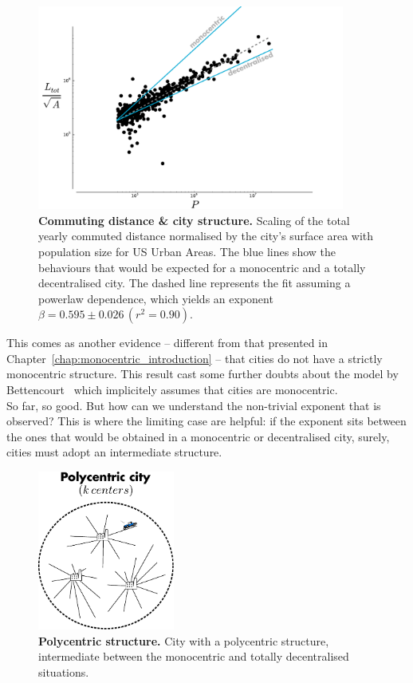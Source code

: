 \begin{figure}
    \centering
    \includegraphics[width=0.9\textwidth]{gfx/chapter-scaling/scaling_commuting_norm.pdf}
    \caption{{\bf Commuting distance \& city structure.} Scaling of the total yearly commuted distance normalised by the
    city's surface area with population size for US Urban Areas. The blue lines
show the behaviours that would be expected for a monocentric and a totally
decentralised city. The dashed line represents the fit assuming a powerlaw
dependence, which yields an exponent $\beta =  0.595 \pm 0.026\, (r^2 =
0.90)$.\label{fig:scaling_Ltot_norm}}
    
\end{figure}

This comes as another evidence -- different from that presented in
Chapter~\ref{chap:monocentric_introduction} -- that cities do not have a
strictly monocentric structure. This result cast some further doubts about the
model by Bettencourt~\cite{Bettencourt:2013} which implicitely assumes that
cities are monocentric.\\

So far, so good. But how can we understand the non-trivial exponent that is observed? This is
where the limiting case are helpful: if the exponent sits between the ones that
would be obtained in a monocentric or decentralised city, surely, cities must
adopt an intermediate structure. 

\begin{figure}[!h]
    \centering
    \includegraphics[width=0.4\textwidth]{gfx/chapter-scaling/polycentric.pdf}
    \caption{{\bf Polycentric structure.} City with a polycentric structure, intermediate between the
    monocentric and totally decentralised situations. \label{fig:polycentric}}
\end{figure}

